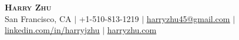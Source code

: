 \pagestyle{fancy}
\fancyhf{} %
\fancyfoot{}
\renewcommand{\headrulewidth}{0pt}
\renewcommand{\footrulewidth}{0pt}

\begin{center}
    \textbf{\Huge\scshape Harry Zhu} \\ \vspace{1pt}
    San Francisco, CA $|$ +1-510-813-1219 $|$ \href{mailto:harryzhu45@gmail.com}{\underline{harryzhu45@gmail.com}}
    $|$ \href{https://linkedin.com/in/harryjzhu}{\underline{linkedin.com/in/harryjzhu}}
    $|$ \href{https://harryzhu.com}{\underline{harryzhu.com}}
\end{center}


